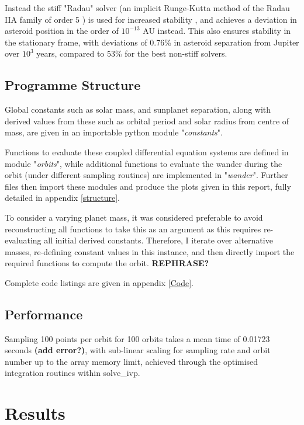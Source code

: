 \documentclass[11pt, a4paper,twocolumn]{article} %
\begin{document}
Instead the stiff "Radau" solver (an implicit Runge-Kutta method of the Radau IIA family of order 5 \cite{Hairer2010}) is used for increased stability \cite{Frank1985}, and achieves a deviation in asteroid position in the order of $ 10^{-13}$ AU instead. This also ensures stability in the stationary frame, with deviations of 0.76\% in asteroid separation from Jupiter over $ 10^{3} $ years, compared to 53\% for the best non-stiff solvers.


\subsection{Programme Structure}
Global constants such as solar mass, and sun\textendash planet separation, along with derived values from these such as orbital period and solar radius from centre of mass, are given in an importable python module "\textit{constants}".

Functions to evaluate these coupled differential equation systems are defined in module "\textit{orbits}", while additional functions to evaluate the wander during the orbit (under different sampling routines) are implemented in "\textit{wander}". Further files then import these modules and produce the plots given in this report, fully detailed in appendix \ref{structure}.

To consider a varying planet mass, it was considered preferable to avoid reconstructing all functions to take this as an argument as this requires re-evaluating all initial derived constants. Therefore, I iterate over alternative masses, re-defining constant values in this instance, and then directly import the required functions to compute the orbit. \textbf{REPHRASE?}

Complete code listings are given in appendix \ref{Code}.


\subsection{Performance}
Sampling 100 points per orbit for 100 orbits takes a mean time of 0.01723 seconds \textbf{(add error?)}, with sub-linear scaling for sampling rate and orbit number up to the array memory limit, achieved through the optimised integration routines within solve\_ivp.


\section{Results}
\end{document}
